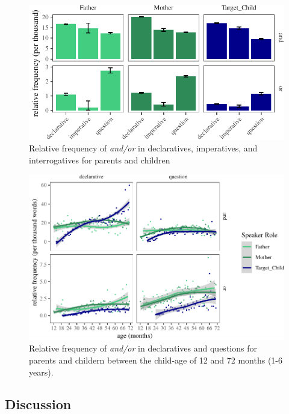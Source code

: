 \documentclass[floatsintext,man]{apa6}
\theoremstyle{definition}
\theoremstyle{definition}
\theoremstyle{definition}
\theoremstyle{remark}
\begin{document}
\begin{figure}[tb]

{\centering \includegraphics{figs/freqTablebySpeechAct-1} 

}

\caption{Relative frequency of \textit{and/or} in declaratives, imperatives, and interrogatives for parents and children }\label{fig:freqTablebySpeechAct}
\end{figure}

\begin{figure}[tb]

{\centering \includegraphics{figs/ageSpeechActPlot-1} 

}

\caption{Relative frequency of \textit{and/or} in declaratives and questions for parents and childern between the child-age of 12 and 72 months (1-6 years).}\label{fig:ageSpeechActPlot}
\end{figure}

\subsection{Discussion}\label{study1discussion}
\end{document}
